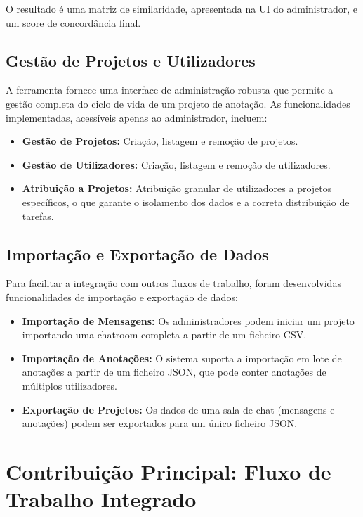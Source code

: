 O resultado é uma matriz de similaridade, apresentada na UI do administrador, e um score de concordância final.

\subsection{Gestão de Projetos e Utilizadores}

A ferramenta fornece uma interface de administração robusta que permite a gestão completa do ciclo de vida de um projeto de anotação. As funcionalidades implementadas, acessíveis apenas ao administrador, incluem:
\begin{itemize}
    \item \textbf{Gestão de Projetos:} Criação, listagem e remoção de projetos.
    \item \textbf{Gestão de Utilizadores:} Criação, listagem e remoção de utilizadores.
    \item \textbf{Atribuição a Projetos:} Atribuição granular de utilizadores a projetos específicos, o que garante o isolamento dos dados e a correta distribuição de tarefas.
\end{itemize}

\subsection{Importação e Exportação de Dados}

Para facilitar a integração com outros fluxos de trabalho, foram desenvolvidas funcionalidades de importação e exportação de dados:
\begin{itemize}
    \item \textbf{Importação de Mensagens:} Os administradores podem iniciar um projeto importando uma chatroom completa a partir de um ficheiro CSV.
    \item \textbf{Importação de Anotações:} O sistema suporta a importação em lote de anotações a partir de um ficheiro JSON, que pode conter anotações de múltiplos utilizadores.
    \item \textbf{Exportação de Projetos:} Os dados de uma sala de chat (mensagens e anotações) podem ser exportados para um único ficheiro JSON.
\end{itemize}

\section{Contribuição Principal: Fluxo de Trabalho Integrado}


